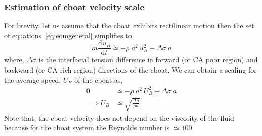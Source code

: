 \documentclass[journal=langd5, manuscript=article, layout=twocolumn]{achemso}
\newcommand{\tdc}[3][]{\frac{\mathrm{d}^{#1}#2}{\mathrm{d}#3^{#1}}} %
\begin{document}
\subsubsection{Estimation of cboat velocity scale}
For brevity, let us assume that the cboat exhibits rectilinear motion then the set of equations~\ref{eq:eomgeneral} simplifies to
\begin{equation}
m \tdc{u_{B}}{t} \simeq -\rho\ a^{2}\ u_{B}^{2} + \Delta\sigma\ a
\end{equation}
where, $\Delta\sigma$ is the interfacial tension difference in forward (or CA poor region) and backward (or CA rich region) directions of the cboat. We can obtain a scaling for the average speed, $U_{B}$ of the cboat as, 
\begin{align}
0 &\simeq -\rho\ a^{2}\ U_{B}^{2} + \Delta\sigma\ a  \nonumber \\
\implies U_{B} &\simeq \sqrt{\frac{\Delta\sigma}{\rho a}} 
\end{align}
Note that, the cboat velocity does not depend on the viscosity of the fluid because for the cboat system the Reynolds number is $\simeq 100$.
\end{document}
